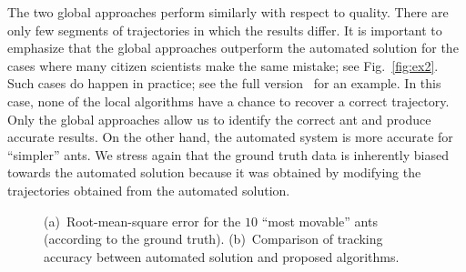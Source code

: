 \documentclass[runningheads]{llncs}
\begin{document}
The two global approaches perform similarly with respect to quality.
There are only few segments of trajectories in which the results differ.
It is important to emphasize that the global approaches outperform the automated solution
for the cases where many citizen scientists make the same mistake; see Fig.~\ref{fig:ex2}.
Such cases do happen in practice; see the full version~\cite{arxiv12} for an example.
In this case, none of the local algorithms have a chance to recover a correct
trajectory. Only the global approaches allow us to identify the
correct ant and produce accurate results.
On the other hand, the automated system is more accurate for ``simpler'' ants.
We stress again that the ground truth data is inherently biased
towards the automated solution because it was obtained by modifying
the trajectories obtained from the automated solution.

%


\begin{figure}[t]
    \center
    \caption{
    (a)~Root-mean-square error for the $10$ ``most movable'' ants
(according to the ground truth).
    (b)~Comparison of tracking accuracy between automated solution and
proposed algorithms.}
\end{figure}
\end{document}
